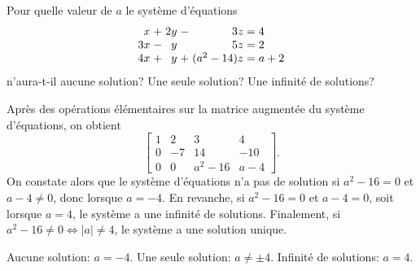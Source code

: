 \begin{exercice}
  Pour quelle valeur de $a$ le système d'équations
  \begin{displaymath}
    \begin{array}{*{2}{r@{\;}c@{\;}}r@{\;=\;}l}
       x &+& 2y &-&          3z & 4 \\
      3x &-&  y & &          5z & 2 \\
      4x &+&  y &+& (a^2 - 14)z & a + 2
    \end{array}
  \end{displaymath}
  n'aura-t-il aucune solution? Une seule solution? Une infinité de
  solutions?
  \begin{sol}
    Après des opérations élémentaires sur la matrice augmentée du
    système d'équations, on obtient
    \begin{displaymath}
      \begin{bmatrix}
        1 &  2 &        3 & 4 \\
        0 & -7 &       14 & -10 \\
        0 &  0 & a^2 - 16 & a - 4
      \end{bmatrix}.
    \end{displaymath}
    On constate alors que le système d'équations n'a pas de solution
    si $a^2 - 16 = 0$ et $a - 4 \neq 0$, donc lorsque $a = -4$. En
    revanche, si $a^2 - 16 = 0$ et $a - 4 = 0$, soit lorsque $a = 4$,
    le système a une infinité de solutions. Finalement, si $a^2 - 16
    \neq 0 \Leftrightarrow |a| \neq 4$, le système a une solution
    unique.
  \end{sol}
  \begin{rep}
    Aucune solution: $a = -4$. Une seule solution: $a \neq \pm 4$.
    Infinité de solutions: $a = 4$.
  \end{rep}
\end{exercice}

